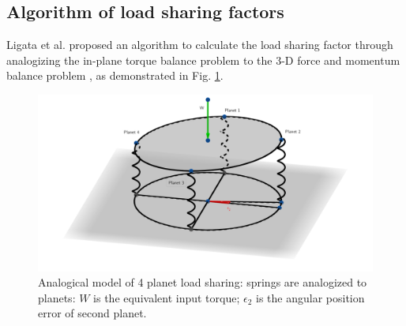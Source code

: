 \documentclass[a4paper,fleqn]{cas-sc}%
\begin{document}
\subsection{Algorithm of load sharing factors\label{sec:algorithm_load_sharing}}
\par Ligata et al. proposed an algorithm to calculate the load sharing factor through analogizing the in-plane torque balance problem to the 3-D force and momentum balance problem \cite{Ligata2009}, as demonstrated in Fig. \ref{fig:analogical_model}.
\begin{figure}[pos=htbp]
    \centering
    \includegraphics[scale=0.2]{Analogical_planet_load.png}
    \caption{Analogical model of 4 planet load sharing: springs are analogized to planets: $W$ is the equivalent input torque; $\epsilon_2$ is the angular position error of second planet.}
    \label{fig:analogical_model}
\end{figure}
\end{document}
